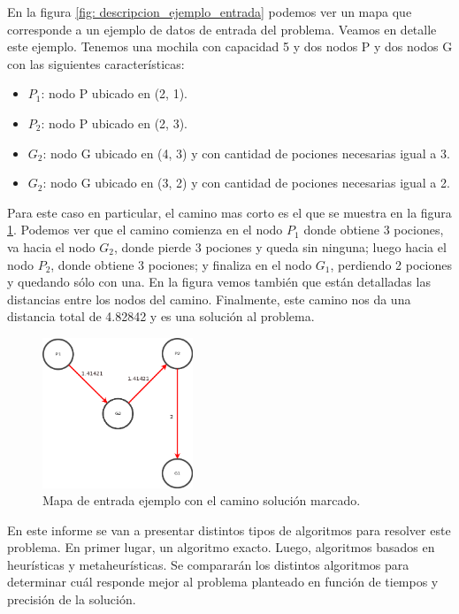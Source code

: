 \par En la figura \ref{fig: descripcion_ejemplo_entrada} podemos ver un mapa que corresponde a un ejemplo de datos de entrada del problema. Veamos en detalle este ejemplo. Tenemos una mochila con capacidad 5 y dos nodos P y dos nodos G con las siguientes características:

\begin{itemize}
	\item $P_1$: nodo P ubicado en (2, 1).
	\item $P_2$: nodo P ubicado en (2, 3).
	\item $G_2$: nodo G ubicado en (4, 3) y con cantidad de pociones necesarias igual a 3.
	\item $G_2$: nodo G ubicado en (3, 2) y con cantidad de pociones necesarias igual a 2.
\end{itemize}

\par Para este caso en particular, el camino mas corto es el que se muestra en la figura \ref{fig: descripcion_ejemplo_solucion}. Podemos ver que el camino comienza en el nodo $P_1$ donde obtiene 3 pociones, va hacia el nodo $G_2$, donde pierde 3 pociones y queda sin ninguna; luego hacia el nodo $P_2$, donde obtiene 3 pociones; y finaliza en el nodo $G_1$, perdiendo 2 pociones y quedando sólo con una. En la figura vemos también que están detalladas las distancias entre los nodos del camino. Finalmente, este camino nos da una distancia total de 4.82842 y es una solución al problema.

\begin{figure}[h]
	\begin{center}
		\includegraphics[width=0.4\textwidth]{img/descripcion/descripcion_ejemplo_solucion.png}
		\caption{Mapa de entrada ejemplo con el camino solución marcado.}
		\label{fig: descripcion_ejemplo_solucion}
	\end{center}
\end{figure}

\par En este informe se van a presentar distintos tipos de algoritmos para resolver este problema. En primer lugar, un algoritmo exacto. Luego, algoritmos basados en heurísticas y metaheurísticas. Se compararán los distintos algoritmos para determinar cuál responde mejor al problema planteado en función de tiempos y precisión de la solución.